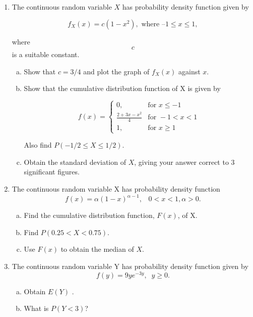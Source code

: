 \documentclass[a4paper,12pt]{article}
\begin{document}
\begin{enumerate}

\item  The continuous random variable $X$ has probability density function given by

$$f_X(x) = c(1-x^2), \mbox{ where } –1\leq x \leq 1,$$

where $$c$$ is a suitable constant.

\begin{enumerate}[(a)]

\item Show that $c = 3/4$ and plot the graph of $f_X(x)$ against $x$.

\item Show that the cumulative distribution function of X is given by

 \[
    f(x) = \begin{cases}
        0, & \text{for } x \leq -1\\
        \frac{2 + 3x - x^2}{4}  & \text{for } -1 < x < 1\\
        1, & \text{for }  x\geq 1
        \end{cases} 
  \]


Also find $P(-1/2 \leq X \leq 1/2 )$.

\item  Obtain the standard deviation of $X$, giving your answer correct to 3 significant figures.

\end{enumerate}


\item The continuous random variable X has probability density function
\[f ( x) = \alpha (1-x)^{\alpha-1} , \;\;\; 0 < x <1, \alpha > 0 .\]
\begin{enumerate}[(a)]
\item  Find the cumulative distribution function, $F(x)$, of X.
\item  Find $P(0.25 < X < 0.75)$.
\item  Use $F(x)$ to obtain the median of $X$.
\end{enumerate}
\item The continuous random variable Y has probability density function given by
\[f ( y)  = 9 ye^{-3y} , \;\; y \geq 0 .\]
\begin{enumerate}[(a)]
\item Obtain $E(Y)$ .
\item What is $P(Y < 3)$?
\end{enumerate}
\end{enumerate}
\end{document}
